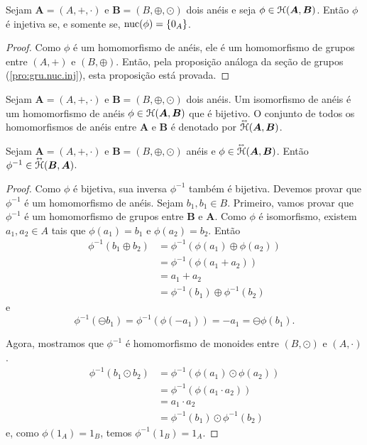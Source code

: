\begin{proposition}
\label{pro:ane.nuc.inj}
	Sejam $\bm A=(A,+,\cdot)$ e $\bm B=(B,\oplus,\odot)$ dois anéis e seja $\phi \in \mathcal{H}(\bm A,\bm B)$. Então $\phi$ é injetiva se, e somente se, $\operatorname{nuc}(\phi)=\{0_A\}$.
\end{proposition}
\begin{proof}
	Como $\phi$ é um homomorfismo de anéis, ele é um homomorfismo de grupos entre $(A,+)$ e $(B,\oplus)$. Então, pela proposição análoga da seção de grupos (\ref{pro:gru.nuc.inj}), esta proposição está provada.
\end{proof}

\begin{definition}
	Sejam $\bm A=(A,+,\cdot)$ e $\bm B=(B,\oplus,\odot)$ dois anéis. Um isomorfismo de anéis é um homomorfismo de anéis $\phi \in \mathcal{H}(\bm A,\bm B)$ que é bijetivo. O conjunto de todos os homomorfismos de anéis entre $\bm A$ e $\bm B$ é denotado por $\accentset{\leftrightarrow}{\mathcal{H}}(\bm A,\bm B)$.
\end{definition}

\begin{proposition}
\label{prop:iso.inv}
	Sejam $\bm A=(A,+,\cdot)$ e $\bm B=(B,\oplus,\odot)$ anéis e $\phi \in \accentset{\leftrightarrow}{\mathcal{H}}(\bm A,\bm B)$. Então $\phi^{-1} \in \accentset{\leftrightarrow}{\mathcal{H}}(\bm B,\bm A)$.
\end{proposition}
\begin{proof}
	Como $\phi$ é bijetiva, sua inversa $\phi^{-1}$ também é bijetiva. Devemos provar que $\phi^{-1}$ é um homomorfismo de anéis. Sejam $b_1,b_1 \in B$. Primeiro, vamos provar que $\phi^{-1}$ é um homomorfismo de grupos entre $\bm B$ e $\bm A$. Como $\phi$ é isomorfismo, existem $a_1,a_2 \in A$ tais que $\phi(a_1)=b_1$ e $\phi(a_2)=b_2$. Então
	\begin{align*}
	\phi^{-1}(b_1 \oplus b_2) &= \phi^{-1}(\phi(a_1) \oplus \phi(a_2)) \\
		&= \phi^{-1}(\phi(a_1+a_2)) \\
		&= a_1+a_2 \\
		&= \phi^{-1}(b_1) \oplus \phi^{-1}(b_2)
	\end{align*}
e
	\begin{equation*}
	\phi^{-1}(\ominus b_1) = \phi^{-1}(\phi(-a_1)) = -a_1 = \ominus \phi(b_1).
	\end{equation*}

	Agora, mostramos que $\phi^{-1}$ é homomorfismo de monoides entre $(B,\odot)$ e $(A,\cdot)$.
	\begin{align*}
	\phi^{-1}(b_1 \odot b_2) &= \phi^{-1}(\phi(a_1) \odot \phi(a_2)) \\
		&= \phi^{-1}(\phi(a_1 \cdot a_2)) \\
		&= a_1 \cdot a_2 \\
		&= \phi^{-1}(b_1) \odot \phi^{-1}(b_2)
	\end{align*}
e, como $\phi(1_A)=1_B$, temos $\phi^{-1}(1_B)=1_A$.
\end{proof}

